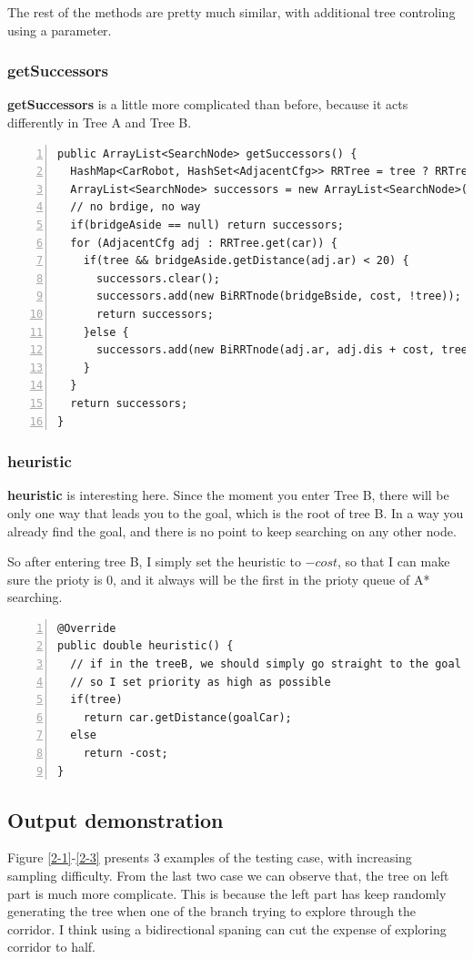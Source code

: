 \documentclass{article}
\begin{document}
The rest of the methods are pretty much similar, with additional tree controling using a parameter.


\subsubsection{getSuccessors}


\textbf{getSuccessors} is a little more complicated than before, because it acts differently in Tree A and Tree B.

\begin{lstlisting}[numbers=left]
public ArrayList<SearchNode> getSuccessors() {
  HashMap<CarRobot, HashSet<AdjacentCfg>> RRTree = tree ? RRTreeA : RRTreeB;
  ArrayList<SearchNode> successors = new ArrayList<SearchNode>();
  // no brdige, no way
  if(bridgeAside == null) return successors;
  for (AdjacentCfg adj : RRTree.get(car)) {
    if(tree && bridgeAside.getDistance(adj.ar) < 20) {
      successors.clear();
      successors.add(new BiRRTnode(bridgeBside, cost, !tree));
      return successors;
    }else {
      successors.add(new BiRRTnode(adj.ar, adj.dis + cost, tree));
    }
  }
  return successors;
}
\end{lstlisting}


\subsubsection{heuristic}


\textbf{heuristic} is interesting here. Since the moment you enter Tree B, there will be only one way that leads you to the goal, which is the root of tree B. In a way you already find the goal, and there is no point to keep searching on any other node.

So after entering tree B, I simply set the heuristic to $-cost$, so that I can make sure the prioty is 0, and it always will be the first in the prioty queue of A* searching.

\begin{lstlisting}[numbers=left]
@Override
public double heuristic() {
  // if in the treeB, we should simply go straight to the goal
  // so I set priority as high as possible
  if(tree)
    return car.getDistance(goalCar);
  else
    return -cost;
}
\end{lstlisting}


\subsection{Output demonstration}
Figure \ref{2-1}-\ref{2-3} presents 3 examples of the testing case, with increasing sampling difficulty. From the last two case we can observe that, the tree on left part is much more complicate. This is because the left part has keep randomly generating the tree when one of the branch trying to explore through the corridor. I think using a bidirectional spaning can cut the expense of exploring corridor to half.
\end{document}
